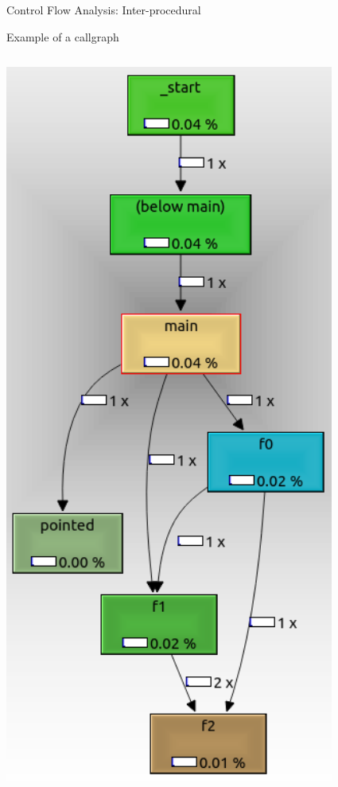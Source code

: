 \begin{frame}{Control Flow Analysis: Inter-procedural}
\begin{exampleblock}{Example of a callgraph}
\begin{columns}
	

\includegraphics[scale=0.55]{content/images/static-analysis/callgraph.png}
\end{columns}
\end{exampleblock}
\end{frame}


